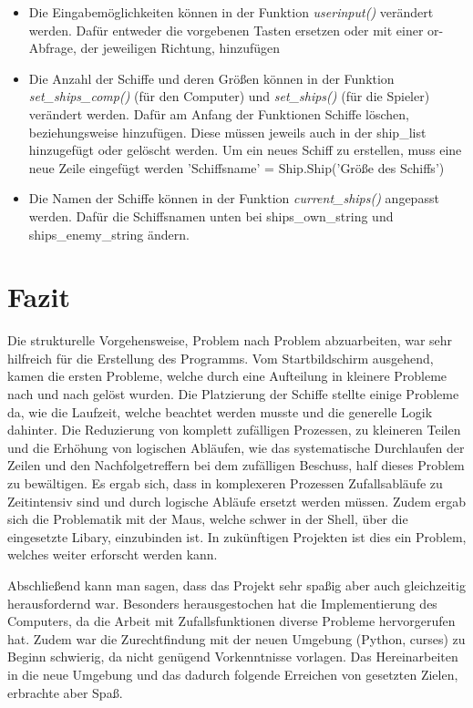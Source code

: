 \documentclass{llncs}
\begin{document}
\begin{itemize}
    \item Die Eingabemöglichkeiten können in der Funktion \emph{userinput()} verändert werden. Dafür entweder die vorgebenen Tasten ersetzen oder mit einer \glqq or\grqq{}-Abfrage, der jeweiligen Richtung, hinzufügen
    \item Die Anzahl der Schiffe und deren Größen können in der Funktion \emph{set\_ships\_comp()} (für den Computer) und \emph{set\_ships()} (für die Spieler) verändert werden. Dafür am Anfang der Funktionen Schiffe löschen, beziehungsweise hinzufügen. Diese müssen jeweils auch in der \glqq ship\_list\grqq{} hinzugefügt oder gelöscht werden. Um ein neues Schiff zu erstellen, muss eine neue Zeile eingefügt werden\: \glqq 'Schiffsname' = Ship.Ship('Größe des Schiffs')\grqq{}
    \item Die Namen der Schiffe können in der Funktion \emph{current\_ships()} angepasst werden. Dafür die Schiffsnamen unten bei \glqq ships\_own\_string\grqq{} und \glqq ships\_enemy\_string\grqq{} ändern.
\end{itemize}

\section{Fazit}

Die strukturelle Vorgehensweise, Problem nach Problem abzuarbeiten, war sehr hilfreich für die Erstellung des Programms. Vom Startbildschirm ausgehend, kamen die ersten Probleme,
welche durch eine Aufteilung in kleinere Probleme nach und nach gelöst wurden. Die Platzierung der Schiffe stellte einige Probleme da, wie die Laufzeit, welche beachtet werden musste 
und die generelle Logik dahinter. Die Reduzierung von komplett zufälligen Prozessen, zu kleineren Teilen und die Erhöhung von logischen Abläufen, wie das systematische Durchlaufen der Zeilen
und den Nachfolgetreffern bei dem zufälligen Beschuss, half dieses Problem zu bewältigen. Es ergab sich, dass in komplexeren Prozessen Zufallsabläufe zu Zeitintensiv sind und durch
logische Abläufe ersetzt werden müssen. Zudem ergab sich die Problematik mit der Maus, welche schwer in der Shell, über die eingesetzte Libary, einzubinden ist. In zukünftigen Projekten
ist dies ein Problem, welches weiter erforscht werden kann.

Abschließend kann man sagen, dass das Projekt sehr spaßig aber auch gleichzeitig herausfordernd war. Besonders herausgestochen hat die Implementierung des Computers, da
die Arbeit mit Zufallsfunktionen diverse Probleme hervorgerufen hat. Zudem war die Zurechtfindung mit der neuen Umgebung (Python, curses) zu Beginn schwierig, da nicht genügend
Vorkenntnisse vorlagen. Das Hereinarbeiten in die neue Umgebung und das dadurch folgende Erreichen von gesetzten Zielen, erbrachte aber Spaß. 
\end{document}
